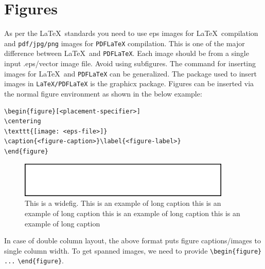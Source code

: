 \documentclass[sn-nature]{sn-jnl}%
\theoremstyle{thmstyleone}%
\theoremstyle{thmstyletwo}%
\theoremstyle{thmstylethree}%
\begin{document}
\section{Figures}\label{sec6}

As per the \LaTeX\ standards you need to use eps images for \LaTeX\ compilation and \verb+pdf/jpg/png+ images for \verb+PDFLaTeX+ compilation. This is one of the major difference between \LaTeX\ and \verb+PDFLaTeX+. Each image should be from a single input .eps/vector image file. Avoid using subfigures. The command for inserting images for \LaTeX\ and \verb+PDFLaTeX+ can be generalized. The package used to insert images in \verb+LaTeX/PDFLaTeX+ is the graphicx package. Figures can be inserted via the normal figure environment as shown in the below example:

\bigskip
\begin{verbatim}
\begin{figure}[<placement-specifier>]
\centering
\texttt{[image: <eps-file>]}
\caption{<figure-caption>}\label{<figure-label>}
\end{figure}
\end{verbatim}
\bigskip

\begin{figure}[h]
    \centering
    \includegraphics[width=0.9\textwidth]{fig.eps}
    \caption{This is a widefig. This is an example of long caption this is an example of long caption  this is an example of long caption this is an example of long caption}\label{fig1}
\end{figure}

In case of double column layout, the above format puts figure captions/images to single column width. To get spanned images, we need to provide \verb+\begin{figure}+ \verb+...+ \verb+\end{figure}+.
\end{document}

